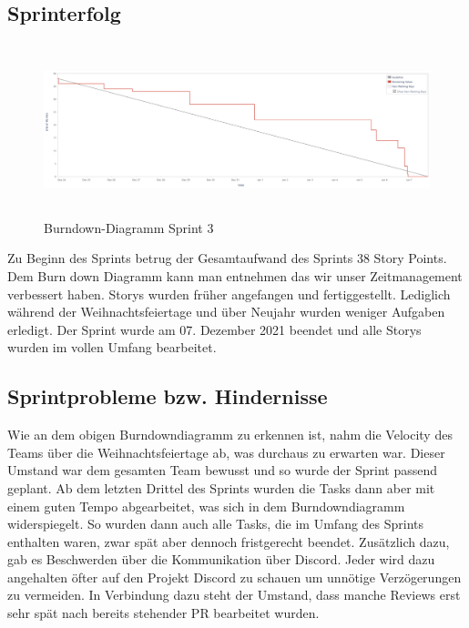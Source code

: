 \documentclass[12pt,a4paper, oneside]{article}
\begin{document}
    \subsection{Sprinterfolg}
    \begin{figure}[h]
        \centering
        \includegraphics[width=\textwidth, height=5cm]{img/sprint_03/Burndown-Sprint3.PNG}
        \caption{Burndown-Diagramm Sprint 3}
        \label{fig: Burndown-Sprint3}
    \end{figure}

    \noindent
    Zu Beginn des Sprints betrug der Gesamtaufwand des Sprints 38 Story Points.
    Dem Burn down Diagramm kann man entnehmen das wir unser Zeitmanagement verbessert haben.
    Storys wurden früher angefangen und fertiggestellt.
    Lediglich während der Weihnachtsfeiertage und über Neujahr wurden weniger Aufgaben erledigt.
    Der Sprint wurde am 07. Dezember 2021 beendet und alle Storys wurden im vollen Umfang bearbeitet.



    \subsection{Sprintprobleme bzw. Hindernisse}

    Wie an dem obigen Burndowndiagramm zu erkennen ist, nahm die Velocity des Teams über die Weihnachtsfeiertage ab, was durchaus zu erwarten war. Dieser Umstand war dem gesamten Team bewusst und so wurde der Sprint passend geplant. Ab dem letzten Drittel des Sprints wurden die Tasks dann aber mit einem guten Tempo abgearbeitet, was sich in dem Burndowndiagramm widerspiegelt. So wurden dann auch alle Tasks, die im Umfang des Sprints enthalten waren, zwar spät aber dennoch fristgerecht beendet. Zusätzlich dazu, gab es Beschwerden über die Kommunikation über Discord. Jeder wird dazu angehalten öfter auf den Projekt Discord zu schauen um unnötige Verzögerungen zu vermeiden. In Verbindung dazu steht der Umstand, dass manche Reviews erst sehr spät nach bereits stehender PR bearbeitet wurden.
\end{document}
